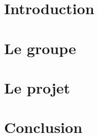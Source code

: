 \documentclass[titlepage, 14pt, a4paper]{report}
\begin{document}
\AddToShipoutPicture*{\BackgroundPic}

\maketitle
\tableofcontents


\newpage
{}
\part{Introduction}
    
    \newpage 

\part{Le groupe}
    
    \newpage 

\part{Le projet}
    
    \newpage 

\part{Conclusion}
    
    \newpage 

\listoffigures

%    
\end{document}
